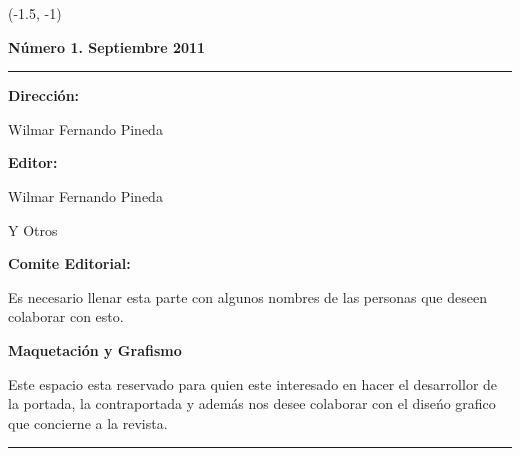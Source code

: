 \begin{textblock}{30}(-1.5, -1)
\begin{minipage}{0.12\linewidth}
\sf\color{barcolor}
\begin{center}

\vspace{1cm}

\colorbox{black}{
{\resizebox{3cm}{0.7cm}{\textcolor{white}{\bf\sf\large GLUD}}}
}

{}

\vspace{3mm}

{\bf Número 1. Septiembre 2011}

\vspace{5cm}

\hrule

\vspace{3mm}

{\bf Dirección: }

\vspace{1mm}

Wilmar Fernando Pineda 

\vspace{2mm}

{\bf Editor:}

\vspace{1mm}

Wilmar Fernando Pineda 

Y Otros

\vspace{4mm}

{\bf Comite Editorial:}

\vspace{1mm}

Es necesario llenar esta parte con algunos nombres de las personas que deseen colaborar con esto.


\vspace{4.0mm}

{\bf Maquetación y Grafismo}

\vspace{1mm}

Este espacio esta reservado para quien este interesado en hacer el desarrollor de la portada, la contraportada
 y además nos desee colaborar con el diseńo grafico que concierne a la revista. 

\vspace{1mm}

\hrule

\vspace{2mm}


\end{center}
\end{minipage}
\end{textblock}
